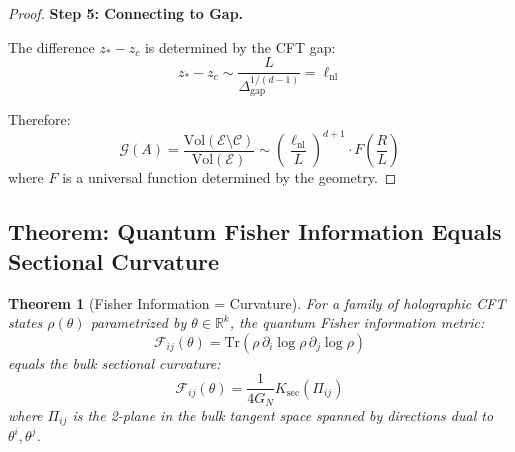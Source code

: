 \documentclass[12pt,a4paper]{article}
\newtheorem{theorem}{Theorem}[section]
\begin{document}
\begin{proof}
\textbf{Step 5: Connecting to Gap.}

The difference $z_* - z_c$ is determined by the CFT gap:
\begin{equation}
z_* - z_c \sim \frac{L}{\Delta_{\text{gap}}^{1/(d-1)}} = \ell_{\text{nl}}
\end{equation}

Therefore:
\begin{equation}
\mathcal{G}(A) = \frac{\text{Vol}(\mathcal{E} \setminus \mathcal{C})}{\text{Vol}(\mathcal{E})} \sim \left(\frac{\ell_{\text{nl}}}{L}\right)^{d+1} \cdot F\left(\frac{R}{L}\right)
\end{equation}
where $F$ is a universal function determined by the geometry.
\end{proof}

\subsection{Theorem: Quantum Fisher Information Equals Sectional Curvature}

\begin{theorem}[Fisher Information = Curvature]\label{thm:fisher-curvature}
For a family of holographic CFT states $\rho(\theta)$ parametrized by $\theta \in \mathbb{R}^k$, the quantum Fisher information metric:
\begin{equation}
\mathcal{F}_{ij}(\theta) = \text{Tr}\left(\rho \, \partial_i \log\rho \, \partial_j \log\rho \right)
\end{equation}
equals the bulk sectional curvature:
\begin{equation}
\mathcal{F}_{ij}(\theta) = \frac{1}{4G_N} K_{\text{sec}}(\Pi_{ij})
\end{equation}
where $\Pi_{ij}$ is the 2-plane in the bulk tangent space spanned by directions dual to $\theta^i, \theta^j$.
\end{theorem}
\end{document}
